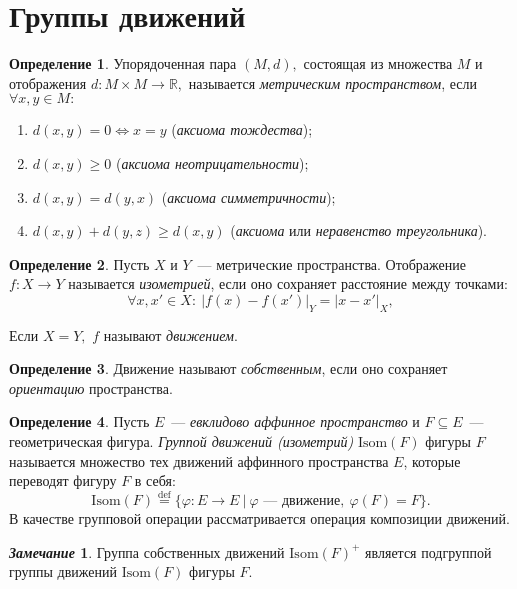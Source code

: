 \documentclass[a4paper, 14pt]{extarticle}
\newcommand{\deq}{\stackrel{\mathrm{def}}{=}}
\newcommand{\n}{\par}
\newcommand{\real}{\mathbb{R}}
\newcommand{\Isom}{\mathrm{Isom}}
\renewcommand{\phi}{\varphi}
\theoremstyle{definition}
\newtheorem*{remark}{\textit{Замечание}}
\newtheorem{definition}{Определение}
\theoremstyle{plain}
\numberwithin{theorem}{section}
\numberwithin{definition}{section}
\numberwithin{statement}{section}
\numberwithin{lemma}{section}
\numberwithin{consequence}{section}
\begin{document}
	\section{Группы движений}
	\setcounter{definition}{0}
	\begin{definition}
		Упорядоченная пара ${(M, d),}$ состоящая из множества $M$ и отображения ${d : M \times M \rightarrow \real,}$  называется \textit{метрическим пространством}, если ${\forall x, y \in M{:}}$
		\begin{enumerate}
			\setlength\itemsep{0.1em}
			\item ${d(x, y) = 0 \Leftrightarrow x = y}$ (\textit{аксиома тождества});
			\item ${d(x, y) \geqslant 0}$ (\textit{аксиома неотрицательности});
			\item ${d(x, y) = d(y, x)}$ (\textit{аксиома симметричности});
			\item ${d(x, y) + d(y, z) \geqslant d(x, y)}$ (\textit{аксиома} или \textit{неравенство треугольника}).
		\end{enumerate}
	\end{definition}
	\begin{definition}
		Пусть $X$ и $Y$~--- метрические пространства. Отображение ${f : X \rightarrow Y}$ называется \textit{изометрией}, если оно сохраняет расстояние между точками:
		\begin{equation*}
			\forall x, x' \in X{:} \ |f(x) - f(x')|_Y = |x - x'|_X,
		\end{equation*} \n
		Если ${X = Y,}$ $f$ называют \textit{движением}.
	\end{definition}
	\begin{definition}
		Движение называют \textit{собственным}, если оно сохраняет \textit{ориентацию} пространства.
	\end{definition}
	\begin{definition}
		Пусть $E$~--- \textit{евклидово аффинное пространство} и ${F \subseteq E}$~--- геометрическая фигура. \textit{Группой движений (изометрий)} ${\Isom(F)}$ фигуры $F$ называется множество тех движений аффинного пространства $E$, которые  переводят фигуру $F$ в себя:
		\begin{equation*}
			\Isom(F) \deq \{\phi: E \rightarrow E \ | \ \phi\textrm{~--- движение}, \ \phi(F) = F\}.
		\end{equation*} 
		В качестве групповой операции рассматривается операция композиции движений.
	\end{definition}
	\begin{remark}
		Группа собственных движений ${\Isom(F)^+}$ является подгруппой группы движений ${\Isom(F)}$ фигуры $F.$
	\end{remark}
\end{document}
